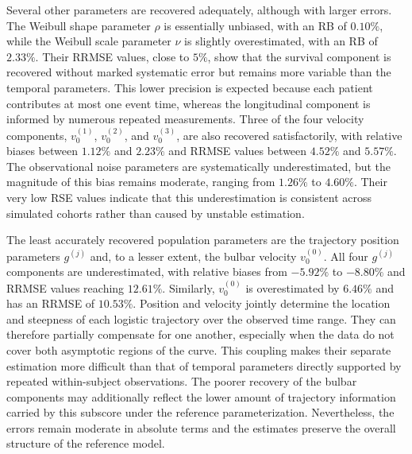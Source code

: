 \documentclass{rapportCS}
\begin{document}
Several other parameters are recovered adequately, although with larger errors. The Weibull shape parameter $\rho$ is essentially unbiased, with an RB of $0.10\%$, while the Weibull scale parameter $\nu$ is slightly overestimated, with an RB of $2.33\%$. Their RRMSE values, close to $5\%$, show that the survival component is recovered without marked systematic error but remains more variable than the temporal parameters. This lower precision is expected because each patient contributes at most one event time, whereas the longitudinal component is informed by numerous repeated measurements. Three of the four velocity components, $v_0^{(1)}$, $v_0^{(2)}$, and $v_0^{(3)}$, are also recovered satisfactorily, with relative biases between $1.12\%$ and $2.23\%$ and RRMSE values between $4.52\%$ and $5.57\%$. The observational noise parameters are systematically underestimated, but the magnitude of this bias remains moderate, ranging from $1.26\%$ to $4.60\%$. Their very low RSE values indicate that this underestimation is consistent across simulated cohorts rather than caused by unstable estimation.

The least accurately recovered population parameters are the trajectory position parameters $g^{(j)}$ and, to a lesser extent, the bulbar velocity $v_0^{(0)}$. All four $g^{(j)}$ components are underestimated, with relative biases from $-5.92\%$ to $-8.80\%$ and RRMSE values reaching $12.61\%$. Similarly, $v_0^{(0)}$ is overestimated by $6.46\%$ and has an RRMSE of $10.53\%$. Position and velocity jointly determine the location and steepness of each logistic trajectory over the observed time range. They can therefore partially compensate for one another, especially when the data do not cover both asymptotic regions of the curve. This coupling makes their separate estimation more difficult than that of temporal parameters directly supported by repeated within-subject observations. The poorer recovery of the bulbar components may additionally reflect the lower amount of trajectory information carried by this subscore under the reference parameterization. Nevertheless, the errors remain moderate in absolute terms and the estimates preserve the overall structure of the reference model.
\end{document}
